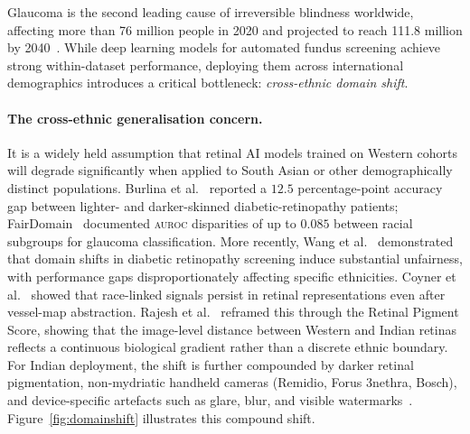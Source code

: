 \documentclass[11pt]{article}
\newcommand{\auroc}{\textsc{auroc}}
\begin{document}
Glaucoma is the second leading cause of irreversible blindness worldwide,
affecting more than 76 million people in 2020 and projected to reach
111.8 million by 2040~\cite{tham2014}. While deep learning models for
automated fundus screening achieve strong within-dataset performance,
deploying them across international demographics introduces a critical
bottleneck: \emph{cross-ethnic domain shift}.

\paragraph{The cross-ethnic generalisation concern.}
It is a widely held assumption that retinal AI models trained on Western 
cohorts will degrade significantly when applied to South Asian or other 
demographically distinct populations. Burlina et al.\  reported a $12.5$ percentage-point
accuracy gap between lighter- and darker-skinned diabetic-retinopathy
patients; FairDomain~\cite{fairDomain2024} documented \auroc{} disparities
of up to $0.085$ between racial subgroups for glaucoma classification. 
More recently, Wang et al.\  demonstrated that domain shifts 
in diabetic retinopathy screening induce substantial unfairness, with performance 
gaps disproportionately affecting specific ethnicities. Coyner et al.\  showed that
race-linked signals persist in retinal representations even after vessel-map
abstraction. Rajesh et al.\  reframed this through the Retinal
Pigment Score, showing that the image-level distance between Western and
Indian retinas reflects a continuous biological gradient rather than a
discrete ethnic boundary. For Indian deployment, the shift is further
compounded by darker retinal pigmentation, non-mydriatic handheld cameras
(Remidio, Forus 3nethra, Bosch), and device-specific artefacts such as
glare, blur, and visible watermarks~\cite{kumar2023}. Figure~\ref{fig:domainshift} illustrates
this compound shift.
\end{document}
